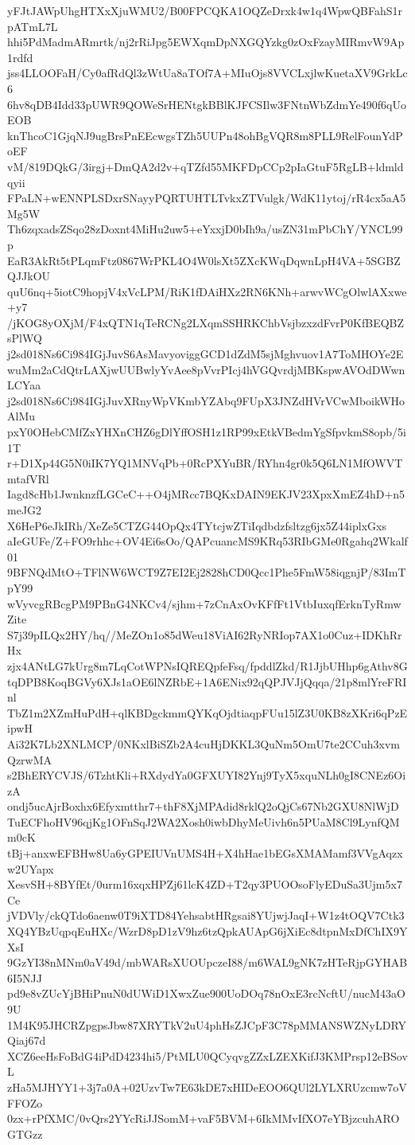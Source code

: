 yFJtJAWpUhgHTXxXjuWMU2/B00FPCQKA1OQZeDrxk4w1q4WpwQBFahS1rpATmL7L
hhi5PdMadmARmrtk/nj2rRiJpg5EWXqmDpNXGQYzkg0zOxFzayMIRmvW9Ap1rdfd
jss4LLOOFaH/Cy0afRdQl3zWtUa8aTOf7A+MIuOjs8VVCLxjlwKuetaXV9GrkLc6
6hv8qDB4Idd33pUWR9QOWeSrHENtgkBBlKJFCSIlw3FNtnWbZdmYe490f6qUoEOB
knThcoC1GjqNJ9ugBrsPnEEcwgsTZh5UUPn48ohBgVQR8m8PLL9RelFounYdPoEF
vM/819DQkG/3irgj+DmQA2d2v+qTZfd55MKFDpCCp2pIaGtuF5RgLB+ldmldqyii
FPaLN+wENNPLSDxrSNayyPQRTUHTLTvkxZTVulgk/WdK11ytoj/rR4cx5aA5Mg5W
Th6zqxadsZSqo28zDoxnt4MiHu2uw5+eYxxjD0bIh9a/usZN31mPbChY/YNCL99p
EaR3AkRt5tPLqmFtz0867WrPKL4O4W0lsXt5ZXcKWqDqwnLpH4VA+5SGBZQJJkOU
quU6nq+5iotC9hopjV4xVcLPM/RiK1fDAiHXz2RN6KNh+arwvWCgOlwlAXxwe+y7
/jKOG8yOXjM/F4xQTN1qTeRCNg2LXqmSSHRKChbVsjbzxzdFvrP0KfBEQBZsPlWQ
j2sd018Ns6Ci984IGjJuvS6AsMavyoviggGCD1dZdM5sjMghvuov1A7ToMHOYe2E
wuMm2aCdQtrLAXjwUUBwlyYvAee8pVvrPIcj4hVGQvrdjMBKspwAVOdDWwnLCYaa
j2sd018Ns6Ci984IGjJuvXRnyWpVKmbYZAbq9FUpX3JNZdHVrVCwMboikWHoAlMu
pxY0OHebCMfZxYHXnCHZ6gDlYffOSH1z1RP99xEtkVBedmYgSfpvkmS8opb/5i1T
r+D1Xp44G5N0iIK7YQ1MNVqPb+0RcPXYuBR/RYhn4gr0k5Q6LN1MfOWVTmtafVRl
Iagd8cHb1JwnknzfLGCeC++O4jMRcc7BQKxDAIN9EKJV23XpxXmEZ4hD+n5meJG2
X6HeP6eJkIRh/XeZe5CTZG44OpQx4TYtcjwZTiIqdbdzfsltzg6jx5Z44iplxGxs
aIeGUFe/Z+FO9rhhc+OV4Ei6sOo/QAPcuancMS9KRq53RIbGMe0Rgahq2Wkalf01
9BFNQdMtO+TFlNW6WCT9Z7EI2Ej2828hCD0Qcc1Phe5FmW58iqgnjP/83ImTpY99
wVyvcgRBcgPM9PBnG4NKCv4/sjhm+7zCnAxOvKFfFt1VtbIuxqfErknTyRmwZite
S7j39pILQx2HY/hq//MeZOn1o85dWeu18ViAI62RyNRIop7AX1o0Cuz+IDKhRrHx
zjx4ANtLG7kUrg8m7LqCotWPNsIQREQpfeFsq/fpddlZkd/R1JjbUHhp6gAthv8G
tqDPB8KoqBGVy6XJs1aOE6lNZRbE+1A6ENix92qQPJVJjQqqa/21p8mlYreFRInl
TbZ1m2XZmHuPdH+qlKBDgckmmQYKqOjdtiaqpFUu15lZ3U0KB8zXKri6qPzEipwH
Ai32K7Lb2XNLMCP/0NKxlBiSZb2A4cuHjDKKL3QuNm5OmU7te2CCuh3xvmQzrwMA
s2BhERYCVJS/6TzhtKli+RXdydYa0GFXUYI82Ynj9TyX5xquNLh0gI8CNEz6OizA
ondj5ucAjrBoxhx6Efyxmtthr7+thF8XjMPAdid8rklQ2oQjCs67Nb2GXU8NlWjD
TuECFhoHV96qjKg1OFnSqJ2WA2Xosh0iwbDhyMeUivh6n5PUaM8Cl9LynfQMm0cK
tBj+anxwEFBHw8Ua6yGPEIUVnUMS4H+X4hHae1bEGsXMAMamf3VVgAqzxw2UYapx
XesvSH+8BYfEt/0urm16xqxHPZj61lcK4ZD+T2qy3PUOOsoFlyEDuSa3Ujm5x7Ce
jVDVly/ckQTdo6aenw0T9iXTD84YehsabtHRgsai8YUjwjJaqI+W1z4tOQV7Ctk3
XQ4YBzUqpqEuHXc/WzrD8pD1zV9hz6tzQpkAUApG6jXiEc8dtpnMxDfChIX9YXsI
9GzYI38nMNm0aV49d/mbWARsXUOUpczeI88/m6WAL9gNK7zHTeRjpGYHAB6I5NJJ
pd9e8vZUcYjBHiPnuN0dUWiD1XwxZue900UoDOq78nOxE3rcNcftU/nucM43aO9U
1M4K95JHCRZpgpsJbw87XRYTkV2uU4phHsZJCpF3C78pMMANSWZNyLDRYQiaj67d
XCZ6eeHsFoBdG4iPdD4234hi5/PtMLU0QCyqvgZZxLZEXKifJ3KMPrsp12eBSovL
zHa5MJHYY1+3j7a0A+02UzvTw7E63kDE7xHIDeEOO6QUl2LYLXRUzcmw7oVFFOZo
0zx+rPfXMC/0vQrs2YYcRiJJSomM+vaF5BVM+6IkMMvIfXO7eYBjzcuhAROGTGzz
